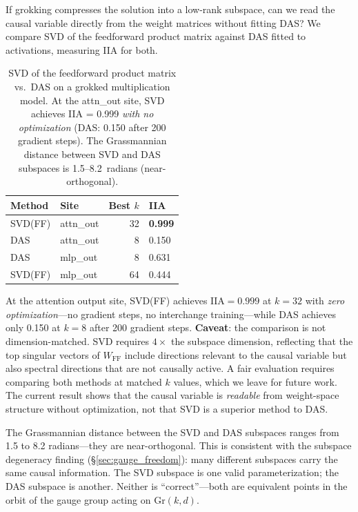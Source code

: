\documentclass{article}
\newcommand{\Gr}{\mathrm{Gr}}
\newcommand{\IIA}{\mathrm{IIA}}
\begin{document}
If grokking compresses the solution into a low-rank subspace, can we read the
causal variable directly from the weight matrices without fitting DAS? We
compare SVD of the feedforward product matrix against DAS fitted to
activations, measuring IIA for both.

\begin{table}[t]
\centering
\small
\begin{tabular}{llrl}
\toprule
Method & Site & Best $k$ & IIA \\
\midrule
SVD(FF) & attn\_out & 32 & \textbf{0.999} \\
DAS     & attn\_out & 8  & 0.150 \\
DAS     & mlp\_out  & 8  & 0.631 \\
SVD(FF) & mlp\_out  & 64 & 0.444 \\
\bottomrule
\end{tabular}
\caption{SVD of the feedforward product matrix vs.\ DAS on a grokked
multiplication model. At the attn\_out site, SVD achieves IIA = 0.999
\emph{with no optimization} (DAS: 0.150 after 200 gradient steps).
The Grassmannian distance between SVD and DAS subspaces is
1.5--8.2~radians (near-orthogonal).}
\label{tab:svd_vs_das}
\end{table}

At the attention output site, SVD(FF) achieves $\IIA = 0.999$ at $k = 32$
with \emph{zero optimization}---no gradient steps, no interchange
training---while DAS achieves only 0.150 at $k = 8$ after 200 gradient
steps. \textbf{Caveat}: the comparison is not dimension-matched. SVD
requires $4\times$ the subspace dimension, reflecting that the top singular
vectors of $W_\text{FF}$ include directions relevant to the causal variable
but also spectral directions that are not causally active. A fair evaluation
requires comparing both methods at matched $k$ values, which we leave for
future work. The current result shows that the causal variable is
\emph{readable} from weight-space structure without optimization, not that
SVD is a superior method to DAS.

The Grassmannian distance between the SVD and DAS subspaces ranges from
1.5 to 8.2 radians---they are near-orthogonal. This is consistent with
the subspace degeneracy finding (\S\ref{sec:gauge_freedom}): many different
subspaces carry the same causal information. The SVD subspace is one
valid parameterization; the DAS subspace is another. Neither is
``correct''---both are equivalent points in the orbit of the gauge
group acting on $\Gr(k,d)$.
\end{document}
